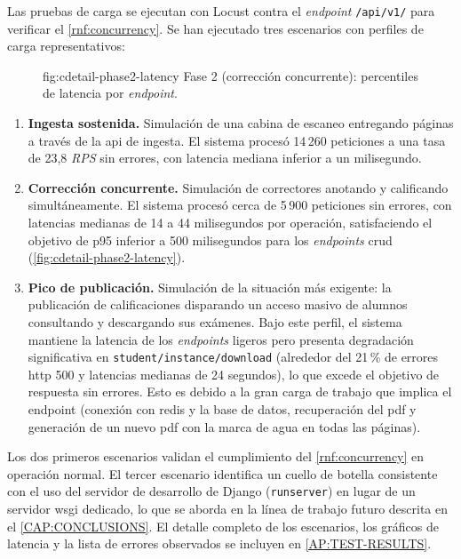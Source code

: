 Las pruebas de carga se ejecutan con Locust contra el \textit{endpoint}
\texttt{/api/v1/} para verificar el \cref{rnf:concurrency}. Se han
ejecutado tres escenarios con perfiles de carga representativos:

\begin{figure}[Fase 2: percentiles de latencia]%
              {fig:cdetail-phase2-latency}%
              {Fase 2 (corrección concurrente): percentiles de latencia
               por \textit{endpoint}.}
\end{figure}

\begin{enumerate}

  \item \textbf{Ingesta sostenida.} Simulación de una cabina de escaneo
  entregando páginas a través de la \acs{api} de ingesta. El sistema
  procesó 14\,260 peticiones a una tasa de 23,8 \textit{RPS} sin
  errores, con latencia mediana inferior a un milisegundo.

  \item \textbf{Corrección concurrente.} Simulación de correctores
  anotando y calificando simultáneamente. El sistema procesó cerca de
  5\,900 peticiones sin errores, con latencias medianas de 14 a 44
  milisegundos por operación, satisfaciendo el objetivo de p95 inferior
  a 500 milisegundos para los \textit{endpoints} \acs{crud} (\cref{fig:cdetail-phase2-latency}).

  \item \textbf{Pico de publicación.} Simulación de la situación más
  exigente: la publicación de calificaciones disparando un acceso masivo
  de alumnos consultando y descargando sus exámenes. Bajo este perfil,
  el sistema mantiene la latencia de los \textit{endpoints} ligeros pero
  presenta degradación significativa en
  \texttt{student/instance/download} (alrededor del 21\,\% de errores
  \acs{http} 500 y latencias medianas de 24 segundos), lo que excede el
  objetivo de respuesta sin errores. Esto es debido a la gran carga de trabajo
  que implica el endpoint (conexión con redis y la base de datos,
  recuperación del pdf y generación de un nuevo pdf con la marca de agua en todas
  las páginas).

\end{enumerate}

Los dos primeros escenarios validan el cumplimiento del
\cref{rnf:concurrency} en operación normal. El tercer escenario
identifica un cuello de botella consistente con el uso del servidor de
desarrollo de Django (\texttt{runserver}) en lugar de un servidor
\acs{wsgi} dedicado, lo que se aborda en la línea de trabajo futuro
descrita en el \cref{CAP:CONCLUSIONS}. El detalle completo de los
escenarios, los gráficos de latencia y la lista de errores observados
se incluyen en \cref{AP:TEST-RESULTS}.

